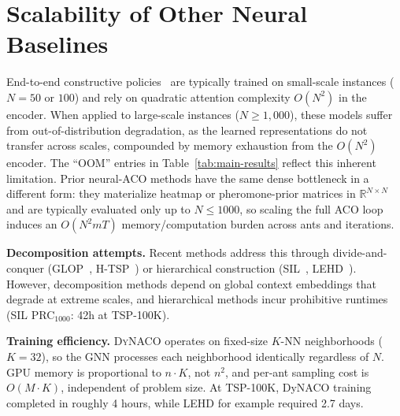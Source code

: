 \documentclass[sigconf]{acmart}
\newcommand{\DyNACO}{\textsc{DyNACO}}
\begin{document}
\section{Scalability of Other Neural Baselines}
\label{app:related}

End-to-end constructive policies~\cite{attentionmodel,pomo,bq,lehd, invit, sigd} are typically trained on small-scale instances ($N{=}50$ or $100$) and rely on quadratic attention complexity $O(N^2)$ in the encoder.
When applied to large-scale instances ($N{\geq}1{,}000$), these models suffer from out-of-distribution degradation, as the learned representations do not transfer across scales, compounded by memory exhaustion from the $O(N^2)$ encoder.
The ``OOM'' entries in Table~\ref{tab:main-results} reflect this inherent limitation.
Prior neural-ACO methods have the same dense bottleneck in a different form: they materialize heatmap or pheromone-prior matrices in $\mathbb{R}^{N\times N}$ and are typically evaluated only up to $N{\leq}1000$, so scaling the full ACO loop induces an $O(N^2 m T)$ memory/computation burden across ants and iterations.

\smallskip\noindent\textbf{Decomposition attempts.}
Recent methods address this through divide-and-conquer (GLOP~\cite{glop}, H-TSP~\cite{htsp}) or hierarchical construction (SIL~\cite{sil}, LEHD~\cite{lehd}).
However, decomposition methods depend on global context embeddings that degrade at extreme scales, and hierarchical methods incur prohibitive runtimes (SIL PRC$_{1000}$: 42h at TSP-100K).

\smallskip\noindent\textbf{Training efficiency.}
\DyNACO{} operates on fixed-size $K$-NN neighborhoods ($K{=}32$), so the GNN processes each neighborhood identically regardless of $N$.
GPU memory is proportional to $n \cdot K$, not $n^2$, and per-ant sampling cost is $O(M \cdot K)$, independent of problem size.
At TSP-100K, DyNACO training completed in roughly 4 hours, while LEHD \cite{lehd} for example required 2.7 days.
\end{document}
